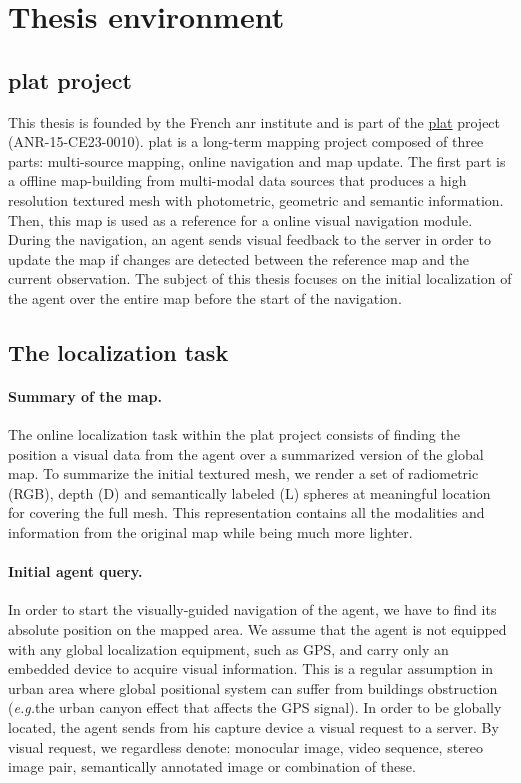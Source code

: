 \section{Thesis environment}
\label{sec:thesis_env}

\subsection{\acs*{plat} project}
\label{subsec:platinum}
This thesis is founded by the French \Ac{anr} institute and is part of the \href{http://platinum.projets.litislab.fr/}{\ac{plat}} project (ANR-15-CE23-0010). \Ac{plat} is a long-term mapping project composed of three parts: multi-source mapping, online navigation and map update. The first part is a offline map-building from multi-modal data sources that produces a high resolution textured mesh with photometric, geometric and semantic information. Then, this map is used as a reference for a online visual navigation module. During the navigation, an agent sends visual feedback to the server in order to update the map if changes are detected between the reference map and the current observation. The subject of this thesis focuses on the initial localization of the agent over the entire map before the start of the navigation.

\subsection{The localization task}
\paragraph{Summary of the map.}
The online localization task within the \ac{plat} project consists of finding the position a visual data from the agent over a summarized version of the global map. To summarize the initial textured mesh, we render a set of radiometric (RGB), depth (D) and semantically labeled (L) spheres at meaningful location for covering the full mesh. This representation contains all the modalities and information from the original map while being much more lighter.

\paragraph{Initial agent query.}
In order to start the visually-guided navigation of the agent, we have to find its absolute position on the mapped area. We assume that the agent is not equipped with any global localization equipment, such as GPS, and carry only an embedded device to acquire visual information. This is a regular assumption in urban area where global positional system can suffer from buildings obstruction (\textit{e.g.}the urban canyon effect that affects the GPS signal). In order to be globally located, the agent sends from his capture device a visual request to a server. By visual request, we regardless denote: monocular image, video sequence, stereo image pair, semantically annotated image or combination of these.

